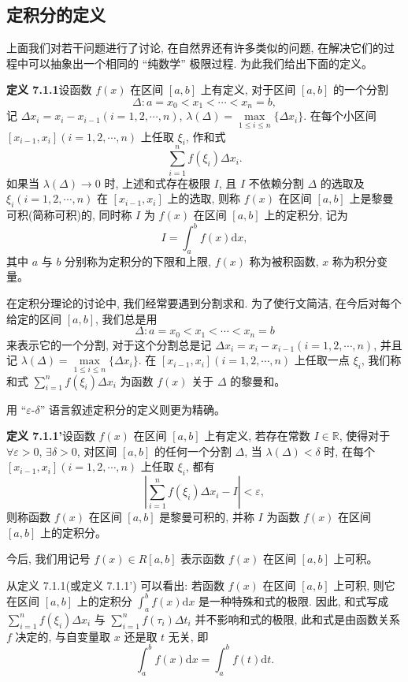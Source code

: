 \documentclass[UTF8, 12pt, fontset=fandol, oneside]{ctexart}
\begin{document}
\subsection{定积分的定义}

上面我们对若干问题进行了讨论, 在自然界还有许多类似的问题, 在解决它们的过程中可以抽象出一个相同的 ``纯数学'' 极限过程. 为此我们给出下面的定义。

\noindent\textbf{定义 7.1.1}\quad 设函数 $f(x)$ 在区间 $[a,b]$ 上有定义, 对于区间 $[a,b]$ 的一个分割
\[
  \Delta:a=x_0<x_1<\cdots<x_n=b,
\]
记 $\Delta x_i=x_i-x_{i-1}(i=1,2,\cdots,n)$, $\lambda(\Delta)=\max\limits_{1\leq i\leq n}\{\Delta x_i\}$. 在每个小区间 $[x_{i-1},x_i](i=1,2,\cdots,n)$ 上任取 $\xi_i$, 作和式
\[
  \sum_{i=1}^n f(\xi_i)\Delta x_i.
\]
如果当 $\lambda(\Delta)\to0$ 时, 上述和式存在极限 $I$, 且 $I$ 不依赖分割 $\Delta$ 的选取及 $\xi_i(i=1,2,\cdots,n)$ 在 $[x_{i-1},x_i]$ 上的选取, 则称 $f(x)$ 在区间 $[a,b]$ 上是黎曼可积(简称可积)的, 同时称 $I$ 为 $f(x)$ 在区间 $[a,b]$ 上的定积分, 记为
\[
  I=\int_a^b f(x)\mathrm dx,
\]
其中 $a$ 与 $b$ 分别称为定积分的下限和上限, $f(x)$ 称为被积函数, $x$ 称为积分变量。

在定积分理论的讨论中, 我们经常要遇到分割求和. 为了使行文简洁, 在今后对每个给定的区间 $[a,b]$, 我们总是用
\[
  \Delta:a=x_0<x_1<\cdots<x_n=b
\]
来表示它的一个分割, 对于这个分割总是记 $\Delta x_i=x_i-x_{i-1}(i=1,2,\cdots,n)$, 并且记 $\lambda(\Delta)=\max\limits_{1\leq i\leq n}\{\Delta x_i\}$. 在 $[x_{i-1},x_i](i=1,2,\cdots,n)$ 上任取一点 $\xi_i$, 我们称和式 $\sum\limits_{i=1}^n f(\xi_i)\Delta x_i$ 为函数 $f(x)$ 关于 $\Delta$ 的黎曼和。

用 ``$\varepsilon$-$\delta$'' 语言叙述定积分的定义则更为精确。

\noindent\textbf{定义 7.1.1'}\quad 设函数 $f(x)$ 在区间 $[a,b]$ 上有定义, 若存在常数 $I\in\mathbb R$, 使得对于 $\forall\varepsilon>0$, $\exists\delta>0$, 对区间 $[a,b]$ 的任何一个分割 $\Delta$, 当 $\lambda(\Delta)<\delta$ 时, 在每个 $[x_{i-1},x_i](i=1,2,\cdots,n)$ 上任取 $\xi_i$, 都有
\[
  \left|\sum_{i=1}^n f(\xi_i)\Delta x_i-I\right|<\varepsilon,
\]
则称函数 $f(x)$ 在区间 $[a,b]$ 是黎曼可积的, 并称 $I$ 为函数 $f(x)$ 在区间 $[a,b]$ 上的定积分。

今后, 我们用记号 $f(x)\in R[a,b]$ 表示函数 $f(x)$ 在区间 $[a,b]$ 上可积。

从定义 7.1.1(或定义 7.1.1') 可以看出: 若函数 $f(x)$ 在区间 $[a,b]$ 上可积, 则它在区间 $[a,b]$ 上的定积分 $\int_a^b f(x)\mathrm dx$ 是一种特殊和式的极限. 因此, 和式写成 $\sum\limits_{i=1}^n f(\xi_i)\Delta x_i$ 与 $\sum\limits_{i=1}^n f(\tau_i)\Delta t_i$ 并不影响和式的极限, 此和式是由函数关系 $f$ 决定的, 与自变量取 $x$ 还是取 $t$ 无关, 即
\[
  \int_a^b f(x)\mathrm dx=\int_a^b f(t)\mathrm dt.
\]
\end{document}
